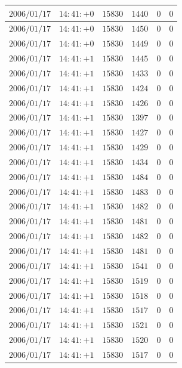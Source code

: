 \documentclass[a4j,papersize,disablejfam,slide,14pt]{jsarticle}
\begin{document}
\begin{description}
\begin{center}
\begin{longtable}{|l|l|l|l|l|l|}
					$2006/01/17$ & $14:41:+0$  & $15830$ & $1440$ & $0$ & $0$ \\ \hline
					$2006/01/17$ & $14:41:+0$  & $15830$ & $1450$ & $0$ & $0$ \\ \hline
					$2006/01/17$ & $14:41:+0$  & $15830$ & $1449$ & $0$ & $0$ \\ \hline
					$2006/01/17$ & $14:41:+1$  & $15830$ & $1445$ & $0$ & $0$ \\ \hline
					$2006/01/17$ & $14:41:+1$  & $15830$ & $1433$ & $0$ & $0$ \\ \hline
					$2006/01/17$ & $14:41:+1$  & $15830$ & $1424$ & $0$ & $0$ \\ \hline
					$2006/01/17$ & $14:41:+1$  & $15830$ & $1426$ & $0$ & $0$ \\ \hline
					$2006/01/17$ & $14:41:+1$  & $15830$ & $1397$ & $0$ & $0$ \\ \hline
					$2006/01/17$ & $14:41:+1$  & $15830$ & $1427$ & $0$ & $0$ \\ \hline
					$2006/01/17$ & $14:41:+1$  & $15830$ & $1429$ & $0$ & $0$ \\ \hline
					$2006/01/17$ & $14:41:+1$  & $15830$ & $1434$ & $0$ & $0$ \\ \hline
					$2006/01/17$ & $14:41:+1$  & $15830$ & $1484$ & $0$ & $0$ \\ \hline
					$2006/01/17$ & $14:41:+1$  & $15830$ & $1483$ & $0$ & $0$ \\ \hline
					$2006/01/17$ & $14:41:+1$  & $15830$ & $1482$ & $0$ & $0$ \\ \hline
					$2006/01/17$ & $14:41:+1$  & $15830$ & $1481$ & $0$ & $0$ \\ \hline
					$2006/01/17$ & $14:41:+1$  & $15830$ & $1482$ & $0$ & $0$ \\ \hline
					$2006/01/17$ & $14:41:+1$  & $15830$ & $1481$ & $0$ & $0$ \\ \hline
					$2006/01/17$ & $14:41:+1$  & $15830$ & $1541$ & $0$ & $0$ \\ \hline
					$2006/01/17$ & $14:41:+1$  & $15830$ & $1519$ & $0$ & $0$ \\ \hline
					$2006/01/17$ & $14:41:+1$  & $15830$ & $1518$ & $0$ & $0$ \\ \hline
					$2006/01/17$ & $14:41:+1$  & $15830$ & $1517$ & $0$ & $0$ \\ \hline
					$2006/01/17$ & $14:41:+1$  & $15830$ & $1521$ & $0$ & $0$ \\ \hline
					$2006/01/17$ & $14:41:+1$  & $15830$ & $1520$ & $0$ & $0$ \\ \hline
					$2006/01/17$ & $14:41:+1$  & $15830$ & $1517$ & $0$ & $0$ \\ \hline

\end{longtable}
\end{center}
\end{description}
\end{document}
